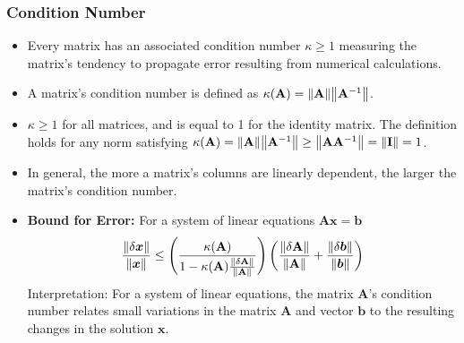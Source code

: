 \documentclass[11pt, a4paper]{article}
\newcommand{\mat}[1]{\mathbf{#1}} %
\begin{document}
\subsubsection{Condition Number}
\begin{itemize}
	\item Every matrix has an associated condition number $ \kappa \geq 1 $ measuring the matrix's tendency to propagate error resulting from numerical calculations.
	
	\item A matrix's condition number is defined as $ \kappa(\mat{A}) = \norm{\mat{A}} \norm{\mat{A}^{-1}} $.  
	
	\item $ \kappa \geq 1 $ for all matrices, and is equal to 1 for the identity matrix. The definition holds for any norm satisfying $ \kappa(\mat{A}) = \norm{\mat{A}} \norm{\mat{A}^{-1}} \geq \norm{\mat{A}\mat{A}^{-1}} = \norm{\mat{I}} = 1 $.
	
	\item In general, the more a matrix's columns are linearly dependent, the larger the matrix's condition number.
	
	\item \textbf{Bound for Error:} For a system of linear equations $ \mat{A} \bm{x} = \bm{b} $
	\begin{equation*}
		\frac{\norm{\delta \bm{x}}}{\norm{\bm{x}}} \leq \Bigg(\frac{\kappa(\mat{A})}{1 - \kappa(\mat{A}) \frac{\norm{\delta \mat{A}}}{\norm{\mat{A}}}}\Bigg) \left(\frac{\norm{\delta \mat{A}}}{\norm{\mat{A}}} + 	\frac{\norm{\delta \bm{b}}}{\norm{\bm{b}}}\right)
	\end{equation*}
	Interpretation: For a system of linear equations, the matrix $ \mat{A} $'s condition number relates small variations in the matrix $\mat{A} $ and vector $ \bm{b} $ to the resulting changes in the solution $ \bm{x} $. 
	
\end{itemize}
\end{document}
